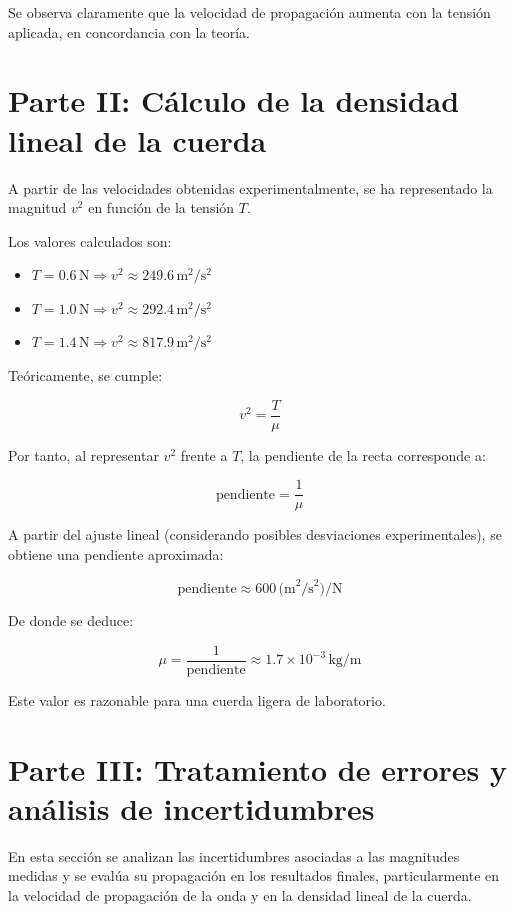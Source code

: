 \documentclass{article}
\begin{document}
Se observa claramente que la velocidad de propagación aumenta con la tensión aplicada, en concordancia con la teoría.


\section{Parte II: Cálculo de la densidad lineal de la cuerda}

A partir de las velocidades obtenidas experimentalmente, se ha representado la magnitud $v^2$ en función de la tensión $T$.

Los valores calculados son:

\begin{itemize}
    \item $T = 0.6\,\text{N} \Rightarrow v^2 \approx 249.6\,\text{m}^2/\text{s}^2$
    \item $T = 1.0\,\text{N} \Rightarrow v^2 \approx 292.4\,\text{m}^2/\text{s}^2$
    \item $T = 1.4\,\text{N} \Rightarrow v^2 \approx 817.9\,\text{m}^2/\text{s}^2$
\end{itemize}

Teóricamente, se cumple:

\[
v^2 = \frac{T}{\mu}
\]

Por tanto, al representar $v^2$ frente a $T$, la pendiente de la recta corresponde a:

\[
\text{pendiente} = \frac{1}{\mu}
\]

A partir del ajuste lineal (considerando posibles desviaciones experimentales), se obtiene una pendiente aproximada:

\[
\text{pendiente} \approx 600\,\text{(m}^2\text{/s}^2)/\text{N}
\]

De donde se deduce:

\[
\mu = \frac{1}{\text{pendiente}} \approx 1.7 \times 10^{-3}\,\text{kg/m}
\]

Este valor es razonable para una cuerda ligera de laboratorio.


\section{Parte III: Tratamiento de errores y análisis de incertidumbres}

En esta sección se analizan las incertidumbres asociadas a las magnitudes medidas y se evalúa su propagación en los resultados finales, particularmente en la velocidad de propagación de la onda y en la densidad lineal de la cuerda.
\end{document}
